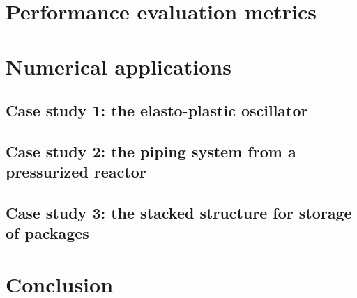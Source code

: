 \section{Performance evaluation metrics}



\section{Numerical applications}


\subsection{Case study 1: the elasto-plastic oscillator}

\subsection{Case study 2: the piping system from a pressurized reactor}

\subsection{Case study 3: the stacked structure for storage of packages}



\section{Conclusion}

